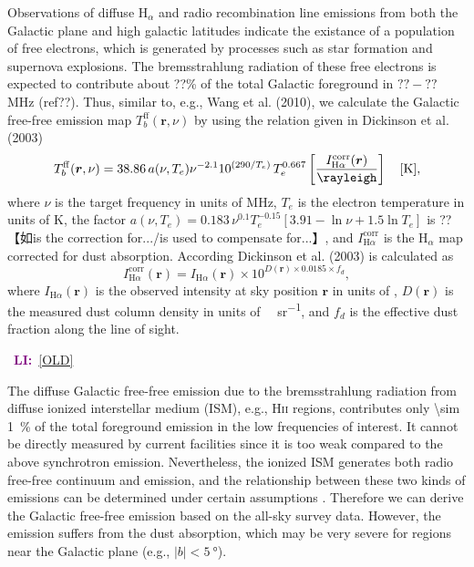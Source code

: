 \documentclass[modern]{aastex61}
\newcommand{\R}[1]{\mathrm{#1}}
\newcommand{\Halpha}{\text{H$\alpha$}}
\newcommand{\Hii}{H\textsc{ii}}
\newcommand{\LI}[1]{\textcolor{purple}{\textbf{LI:}}~\uline{#1}}
\begin{document}
Observations of diffuse H$_{\alpha}$ and radio recombination line emissions
from both the Galactic plane and high galactic latitudes
indicate the existance of a population of free electrons, which is generated
by processes such as star formation and supernova explosions.
The bremsstrahlung radiation of these free electrons is expected to
contribute about ??\% of the total Galactic foreground in
$?? - ??$ MHz (ref??). Thus, similar to, e.g., Wang et al. (2010), we
calculate the Galactic free-free emission map $T_b^{\R{ff}}(\bm{r}, \nu)$
by using the relation given in Dickinson et al. (2003)
\begin{equation}
  T_b^{\R{ff}}(\bm{r}, \nu) = 38.86 \, a(\nu, T_e) \nu^{-2.1}
    10^{(290 / T_e)} \, T_e^{0.667}
    \left[ \frac{I_{\Halpha}^{\R{corr}}(\bm{r})}{\si{\rayleigh}} \right]
    \quad [\si{\kelvin}],
\end{equation}
where $\nu$ is the target frequency in units of \si{\MHz}, $T_e$ is the
electron temperature in units of \si{\kelvin},
the factor $a(\nu, T_e) = 0.183 \,\nu^{0.1} T_e^{-0.15} [ 3.91 - \ln \nu +
1.5 \ln T_e ]$ is ??【如is the correction for.../is used to compensate
for...】,
and $I_{\Halpha}^{\R{corr}}$ is the H$_{\alpha}$ map corrected for dust
absorption. According Dickinson et al. (2003) is calculated as
\begin{equation}
  I_{\Halpha}^{\R{corr}}(\bm{r}) = I_{\Halpha}(\bm{r}) \times
    10^{D(\bm{r}) \times 0.0185 \times f_d},
\end{equation}
where $I_{\Halpha}(\bm{r})$ is the observed \Halpha{} intensity at sky
position $\bm{r}$ in units of \si{\rayleigh},
$D(\bm{r})$ is the measured dust column density in units of
\si{\mega\jansky\per\steradian},
and $f_d$ is the effective dust fraction along the line of sight.

\noindent\hrulefill~\LI{[OLD]}~\hrulefill

The diffuse Galactic free-free emission due to the bremsstrahlung
radiation from diffuse ionized interstellar medium (ISM),
e.g., \Hii{} regions, contributes only \SI{\sim 1}{\percent} of the total
foreground emission in the low frequencies of interest.
It cannot be directly measured by current facilities since it is too
weak compared to the above synchrotron emission.
Nevertheless, the ionized ISM generates both radio free-free continuum
and \Halpha{} emission, and the relationship between these two kinds of
emissions can be determined under certain assumptions \citep{dickinson2003}.
Therefore we can derive the Galactic free-free emission based on the
all-sky \Halpha{} survey data.
However, the \Halpha{} emission suffers from the dust absorption, which
may be very severe for regions near the Galactic plane
(e.g., $|b| < \SI{5}{\degree}$).
\end{document}
